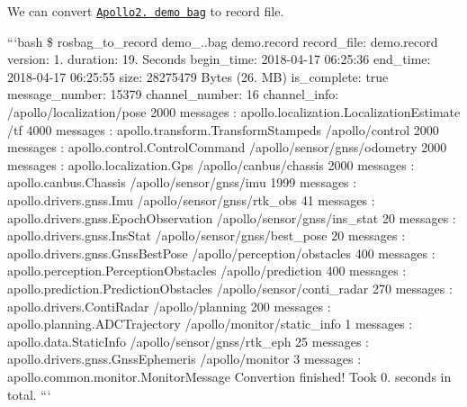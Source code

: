 We can convert \href{https://github.com/ApolloAuto/apollo/releases/download/v2.5.0/demo_2.5.bag}{\tt Apollo2. demo bag} to record file.

```bash \$ rosbag\-\_\-to\-\_\-record demo\-\_..\-bag demo.\-record record\-\_\-file\-: demo.\-record version\-: 1. duration\-: 19. Seconds begin\-\_\-time\-: 2018-\/04-\/17 06\-:25\-:36 end\-\_\-time\-: 2018-\/04-\/17 06\-:25\-:55 size\-: 28275479 Bytes (26. M\-B) is\-\_\-complete\-: true message\-\_\-number\-: 15379 channel\-\_\-number\-: 16 channel\-\_\-info\-: /apollo/localization/pose 2000 messages \-: apollo.\-localization.\-Localization\-Estimate /tf 4000 messages \-: apollo.\-transform.\-Transform\-Stampeds /apollo/control 2000 messages \-: apollo.\-control.\-Control\-Command /apollo/sensor/gnss/odometry 2000 messages \-: apollo.\-localization.\-Gps /apollo/canbus/chassis 2000 messages \-: apollo.\-canbus.\-Chassis /apollo/sensor/gnss/imu 1999 messages \-: apollo.\-drivers.\-gnss.\-Imu /apollo/sensor/gnss/rtk\-\_\-obs 41 messages \-: apollo.\-drivers.\-gnss.\-Epoch\-Observation /apollo/sensor/gnss/ins\-\_\-stat 20 messages \-: apollo.\-drivers.\-gnss.\-Ins\-Stat /apollo/sensor/gnss/best\-\_\-pose 20 messages \-: apollo.\-drivers.\-gnss.\-Gnss\-Best\-Pose /apollo/perception/obstacles 400 messages \-: apollo.\-perception.\-Perception\-Obstacles /apollo/prediction 400 messages \-: apollo.\-prediction.\-Prediction\-Obstacles /apollo/sensor/conti\-\_\-radar 270 messages \-: apollo.\-drivers.\-Conti\-Radar /apollo/planning 200 messages \-: apollo.\-planning.\-A\-D\-C\-Trajectory /apollo/monitor/static\-\_\-info 1 messages \-: apollo.\-data.\-Static\-Info /apollo/sensor/gnss/rtk\-\_\-eph 25 messages \-: apollo.\-drivers.\-gnss.\-Gnss\-Ephemeris /apollo/monitor 3 messages \-: apollo.\-common.\-monitor.\-Monitor\-Message Convertion finished! Took 0. seconds in total. ``` 